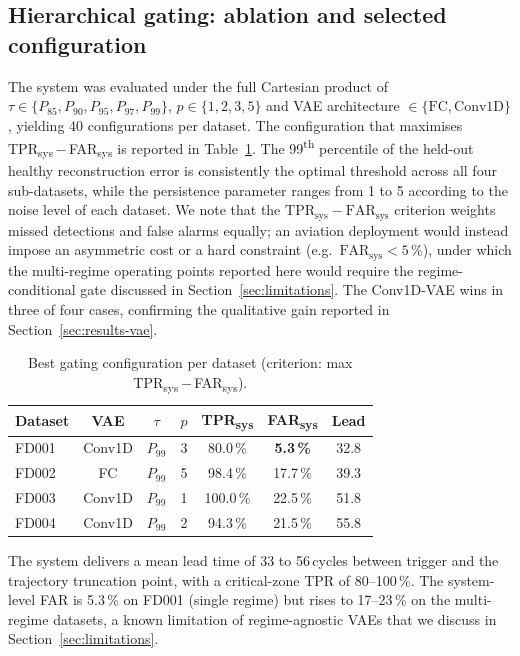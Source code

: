 \documentclass[5p,times,authoryear]{elsarticle}
\begin{document}
\subsection{Hierarchical gating: ablation and selected configuration}\label{sec:results-ablation}

The system was evaluated under the full Cartesian product of $\tau\in\{P_{85},P_{90},P_{95},P_{97},P_{99}\}$, $p\in\{1,2,3,5\}$ and VAE architecture $\in\{\text{FC},\text{Conv1D}\}$, yielding 40 configurations per dataset. The configuration that maximises TPR\textsubscript{sys}\,$-$\,FAR\textsubscript{sys} is reported in Table~\ref{tab:gating-best}. The 99\textsuperscript{th} percentile of the held-out healthy reconstruction error is consistently the optimal threshold across all four sub-datasets, while the persistence parameter ranges from 1 to 5 according to the noise level of each dataset. We note that the $\mathrm{TPR}_{\mathrm{sys}}-\mathrm{FAR}_{\mathrm{sys}}$ criterion weights missed detections and false alarms equally; an aviation deployment would instead impose an asymmetric cost or a hard constraint (e.g.\ $\mathrm{FAR}_{\mathrm{sys}}<5\,\%$), under which the multi-regime operating points reported here would require the regime-conditional gate discussed in Section~\ref{sec:limitations}. The Conv1D-VAE wins in three of four cases, confirming the qualitative gain reported in Section~\ref{sec:results-vae}.

\begin{table}[!t]
\centering
\caption{Best gating configuration per dataset (criterion: max TPR\textsubscript{sys}\,$-$\,FAR\textsubscript{sys}).}
\label{tab:gating-best}
\small
\begin{tabular}{lcccccc}
\toprule
Dataset & VAE & $\tau$ & $p$ & TPR\textsubscript{sys} & FAR\textsubscript{sys} & Lead \\
\midrule
FD001 & Conv1D & $P_{99}$ & 3 & 80.0\,\%  & \textbf{5.3\,\%}  & 32.8 \\
FD002 & FC     & $P_{99}$ & 5 & 98.4\,\%  & 17.7\,\%          & 39.3 \\
FD003 & Conv1D & $P_{99}$ & 1 & 100.0\,\% & 22.5\,\%          & 51.8 \\
FD004 & Conv1D & $P_{99}$ & 2 & 94.3\,\%  & 21.5\,\%          & 55.8 \\
\bottomrule
\end{tabular}
\end{table}

The system delivers a mean lead time of 33 to 56\,cycles between trigger and the trajectory truncation point, with a critical-zone TPR of 80--100\,\%. The system-level FAR is 5.3\,\% on FD001 (single regime) but rises to 17--23\,\% on the multi-regime datasets, a known limitation of regime-agnostic VAEs that we discuss in Section~\ref{sec:limitations}.
\end{document}
